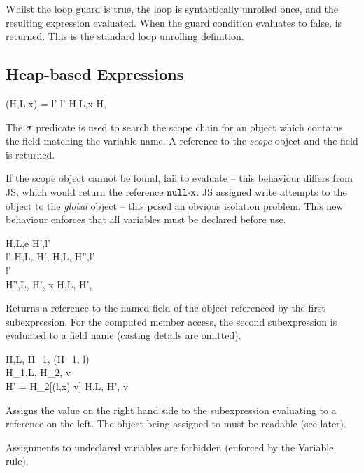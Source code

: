 \documentclass[a4paper,notitlepage]{report}
\begin{document}
  Whilst the loop guard is true, the loop is syntactically unrolled once, and
  the resulting expression evaluated. When the guard condition evaluates to
  false, \und is returned. This is the standard loop unrolling definition.

  \subsection{Heap-based Expressions}
    {\scope(H,L,x) = l' \quad l' \neq \nil}
    {H,L,\js x \evalsto H, }

  The $\sigma$ predicate is used to search the scope chain for an object which
  contains the field matching the variable name. A reference to the \emph{scope}
  object and the field is returned.

  If the scope object cannot be found, fail to evaluate -- this
  behaviour differs from JS, which would return the reference
  $\fld{\nil}{\js{x}}$.  JS assigned write attempts to the \nil object to the
  \emph{global} object -- this posed an obvious isolation problem.
  This new behaviour enforces that all variables must be declared before use.

  {H,L,\js e \gevalsto H',l' \\
   l' \neq \nil}
  {H,L, \evalsto H', }
\qquad
  {H,L, \gevalsto H'',l' \\
   l' \neq \nil \\
   H'',L, \evalsto H', x}
  {H,L, \evalsto H',}

  Returns a reference to the named field of the object referenced by the first
  subexpression. For the computed member access, the second subexpression is
  evaluated to a field name (casting details are omitted).

  {H,L, \evalsto H_1, \qquad
   \ReadWrite(H_1, l) \\
   H_1,L, \gevalsto H_2, v \\
   H' = H_2[(l,x) \pointsto v]}
  {H,L, \evalsto H', v}

  Assigns the value on the right hand side to the subexpression evaluating to a
  reference on the left. The object being assigned to must be readable (see
  later).

  Assignments to undeclared variables are forbidden (enforced by the Variable
  rule).
\end{document}
